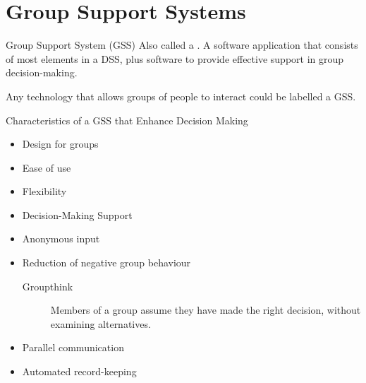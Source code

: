 \documentclass[\main/notes.tex]{subfiles}
\begin{document}
		\section{Group Support Systems}
			\begin{definition}{Group Support System (GSS)}
				Also called a . A software application that consists of most elements in a DSS, plus software to provide effective support in group decision-making.

				Any technology that allows groups of people to interact could be labelled a GSS.
			\end{definition}
			\begin{sidenote}{Characteristics of a GSS that Enhance Decision Making}
				\begin{itemize}[nosep]
					\item Design for groups
					\item Ease of use
					\item Flexibility
					\item Decision-Making Support
					\item Anonymous input
					\item Reduction of negative group behaviour
						\begin{description}
							\item[Groupthink] Members of a group assume they have made the right decision, without examining alternatives.
						\end{description}
					\item Parallel communication
					\item Automated record-keeping
				\end{itemize}
			\end{sidenote}

		\pagebreak
\end{document}
